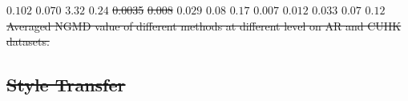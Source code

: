 \documentclass[10pt,twocolumn,letterpaper]{article}
\providecommand{\DIFdeltex}[1]{{\protect\color{red}\sout{#1}}}                      %
\providecommand{\DIFdelFL}[1]{\DIFdel{#1}} %
\providecommand{\DIFdel}[1]{\texorpdfstring{\DIFdeltex{#1}}{}} %
\begin{document}
\DIFdelFL{$0.102$}%
\DIFdelFL{$0.070$}%
\DIFdelFL{$3.32$}%
\DIFdelFL{$0.24$}%
\DIFdelFL{0.0035}%
\DIFdelFL{0.008}%
\DIFdelFL{$0.029$}%
\DIFdelFL{$0.08$}%
\DIFdelFL{$0.17$}%
\DIFdelFL{$0.007$}%
\DIFdelFL{$0.012$}%
\DIFdelFL{$0.033$}%
\DIFdelFL{$0.07$}%
\DIFdelFL{$0.12$}%
{%
\DIFdelFL{Averaged NGMD value of different methods at different level on AR and CUHK datasets.}}
\subsection{\DIFdel{Style Transfer}}
\addtocounter{subsection}{-1}%
\end{document}
